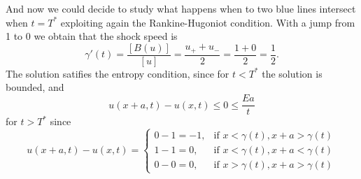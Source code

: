 And now we could decide to study what happens when to two blue lines intersect when $t = T^*$
exploiting again the Rankine-Hugoniot condition. With a jump from 1 to 0 we obtain that the shock speed is
\[
    \gamma'(t) = \frac{[B(u)]}{[u]} = \frac{u_+ + u_-}{2} = \frac{1 + 0}{2} = \frac{1}{2}.
\]
The solution satifies the entropy condition, since for $t < T^*$ the solution
is bounded, and 
\[
u(x+a,t)-u(x,t) \leq 0 \leq \frac{Ea}{t} 
\]
for $t > T^*$ since
\[
    u(x+a,t)-u(x,t) = \begin{cases}
        0-1 = -1, & \text{if } x < \gamma(t), x+a > \gamma(t) \\
        1-1 = 0,   & \text{if } x < \gamma(t), x+a < \gamma(t) \\
        0-0 = 0,   & \text{if } x > \gamma(t), x+a > \gamma(t)
    \end{cases}
\]

